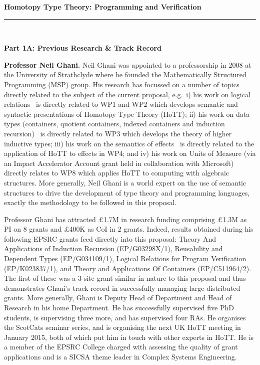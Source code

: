 \documentclass[a4paper,11pt]{article}
\newcommand{\eg}{{e.g.}\ }
\begin{document}
\thispagestyle{plain}
\begin{center}
  {\Large {\bf Homotopy Type Theory: Programming and Verification}}\\[1ex] 

\vspace*{-0.1in}

  \rule{140mm}{.5mm}\\[2ex]
\end{center}

\noindent
{\bf \Large Part 1A: Previous Research \& Track Record}

\textbf{Professor Neil Ghani.} Neil Ghani was appointed to a
professorship in 2008 at the University of Strathclyde where he founded the
Mathematically Structured Programming (MSP) group. His research has
focussed on a number of topics directly related to the subject of the
current proposal, \eg i) his work on logical relations~\cite{} is directly
related to WP1 and WP2 which develops semantic and syntactic
presentations of Homotopy Type Theory (HoTT); ii) his work on data
types (containers, quotient containers, indexed containers and
induction recursion)~\cite{} is directly related to WP3 which develops the
theory of higher inductive types; iii) his work on the semantics of
effects~\cite{} is directly related to the application of HoTT to effects in
WP4; and iv) his work on Units of Measure (via an Impact Accelerator
Account grant held in collaboration with Microsoft) directly relates
to WP8 which applies HoTT to computing with algebraic structures. More
generally, Neil Ghani is a world expert on the use of semantic
structures to drive the development of type theory and programming
languages, exactly the methodology to be followed in this proposal.

Professor Ghani has attracted \pounds 1.7M in research funding
comprising \pounds 1.3M as PI on 8 grants and \pounds 400K as CoI in 2
grants.  Indeed, results obtained during his following EPSRC grants
feed directly into this proposal: Theory And Applications of Induction
Recursion (EP/G03298X/1), Reusability and Dependent Types
(EP/G034109/1), Logical Relations for Program Verification
(EP/K023837/1), and Theory and Applications Of Containers
(EP/C511964/2). The first of these was a 3-site grant similar in
nature to this proposal and thus demonstrates Ghani's track record in
successfully managing large distributed grants. More generally, Ghani
is Deputy Head of Department and Head of Research in his home
Department. He has successfully supervised five PhD students, is
supervising three more, and has supervised four
RAs. He organises the ScotCats seminar series, and is organising the next
UK HoTT meeting in January 2015, both of which put him in touch with
other experts in HoTT. He is a member of the EPSRC College charged
with assessing the quality of grant applications and is a SICSA theme leader in
Complex Systems Engineering.
\end{document}
